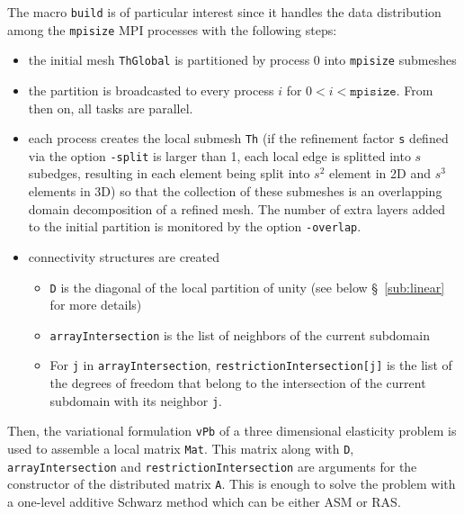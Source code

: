  The macro \texttt{build} is of particular interest since it handles the data distribution among the \texttt{mpisize} MPI processes with the following steps:
\begin{itemize}
	\item  the initial mesh \texttt{ThGlobal} is partitioned  by process 0 into \texttt{mpisize} submeshes
	\item  the partition is broadcasted to every process $i$ for $0 < i < \texttt{mpisize}$. From then on, all tasks are parallel. 
	\item  each process creates the local submesh \texttt{Th} (if the refinement factor \texttt{s} defined via the option \texttt{-split} is larger than 1, each local edge is splitted into $s$ subedges, resulting in each element being split into $s^2$ element in 2D and $s^3$ elements in 3D) so that the collection of these submeshes is an overlapping domain decomposition of a refined mesh. The number of extra layers added to the initial partition is monitored by the option \texttt{-overlap}.
	\item  connectivity structures are created
	\begin{itemize}
		\item \texttt{D} is the diagonal of the local partition of unity (see below \S~\ref{sub:linear} for more details)
		\item \texttt{arrayIntersection} is the list of neighbors of the current subdomain
		\item For \texttt{j} in \texttt{arrayIntersection}, \texttt{restrictionIntersection[j]} is the list of the degrees of freedom that belong to the intersection of the current subdomain with its neighbor \texttt{j}. 
	\end{itemize} 
\end{itemize} 
Then, the variational formulation \texttt{vPb} of a three dimensional elasticity problem is used to assemble a local matrix \texttt{Mat}. This matrix along with  \texttt{D}, \texttt{arrayIntersection} and \texttt{restrictionIntersection} are arguments for the constructor of the distributed matrix \texttt{A}. This is enough to solve the problem with a one-level additive Schwarz method which can be either ASM or RAS.\\

